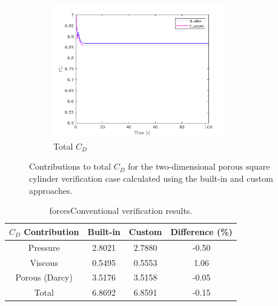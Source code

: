 \documentclass[a4paper,11pt]{report}
\begin{document}
\begin{figure}[ht]
    \begin{subfigure}[b]{75mm}
        \includegraphics[width=75mm]{"total_x.png"}
        \caption{Total $C_D$}
        \label{fig:pty095_Da1e-4}
    \end{subfigure}
    \caption{Contributions to total $C_D$ for the two-dimensional porous square cylinder verification case calculated using the built-in and custom approaches.}\label{fig:forcesConventional_verification1}
\end{figure}
\begin{table}[ht]
\centering
\begin{tabular}{ c | c | c | c }
    $C_D$ Contribution & Built-in & Custom & Difference (\%) \\
    \hline\hline
    Pressure & 2.8021 & 2.7880 & -0.50\\
    \hline
    Viscous & 0.5495 & 0.5553 & 1.06\\
    \hline
    Porous (Darcy) & 3.5176 & 3.5158 & -0.05\\
    \hline
    Total & 6.8692 & 6.8591 & -0.15\\
\end{tabular}
\caption{forcesConventional verification results.}
\label{table:forcesConventional_verification1}
\end{table}\\
\end{document}
